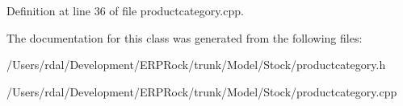 \-Definition at line 36 of file productcategory.\-cpp.



\-The documentation for this class was generated from the following files\-:\begin{DoxyCompactItemize}
\item 
/\-Users/rdal/\-Development/\-E\-R\-P\-Rock/trunk/\-Model/\-Stock/productcategory.\-h\item 
/\-Users/rdal/\-Development/\-E\-R\-P\-Rock/trunk/\-Model/\-Stock/productcategory.\-cpp\end{DoxyCompactItemize}
